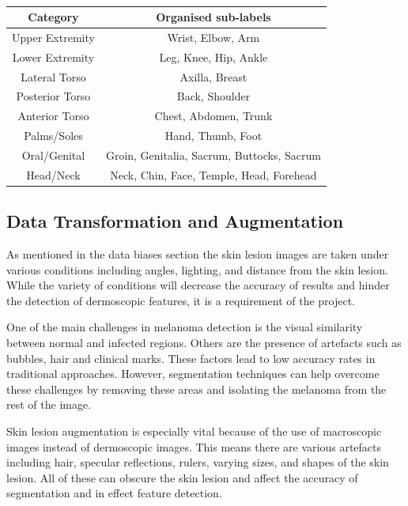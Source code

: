 \begin{table}
	\small
	\begin{tabular}{|c|c|}
		\hline
		Category & Organised sub-labels
		\\
		\hline
		Upper Extremity & Wrist, Elbow, Arm
		\\
		\hline
		Lower Extremity & Leg, Knee, Hip, Ankle
		\\
		\hline
		Lateral Torso & Axilla, Breast
		\\
		\hline
		Posterior Torso & Back, Shoulder
		\\
		\hline
		Anterior Torso & Chest, Abdomen, Trunk
		\\
		Palms/Soles & Hand, Thumb, Foot
		\\
		\hline
		Oral/Genital & Groin, Genitalia, Sacrum, Buttocks, Sacrum
		\\
		\hline
		Head/Neck & Neck, Chin, Face, Temple, Head, Forehead
		\\
		\hline
	\end{tabular}
	\caption{}
\end{table} \label{nhs-location-names}

\subsection{Data Transformation and Augmentation}
As mentioned in the data biases section the skin lesion images are taken under various conditions including angles, lighting, and distance from the skin lesion. While the variety of conditions will decrease the accuracy of results and hinder the detection of dermoscopic features, it is a requirement of the project.

One of the main challenges in melanoma detection is the visual similarity between normal and infected regions. Others are the presence of artefacts such as bubbles, hair and clinical marks\cite{Albahli2020}. These factors lead to low accuracy rates in traditional approaches. However, segmentation techniques can help overcome these challenges by removing these areas and isolating the melanoma from the rest of the image.

Skin lesion augmentation is especially vital because of the use of macroscopic images instead of dermoscopic images. This means there are various artefacts including hair, specular reflections, rulers, varying sizes, and shapes of the skin lesion. All of these can obscure the skin lesion and affect the accuracy of segmentation\cite{Unver2019} and in effect feature detection.

